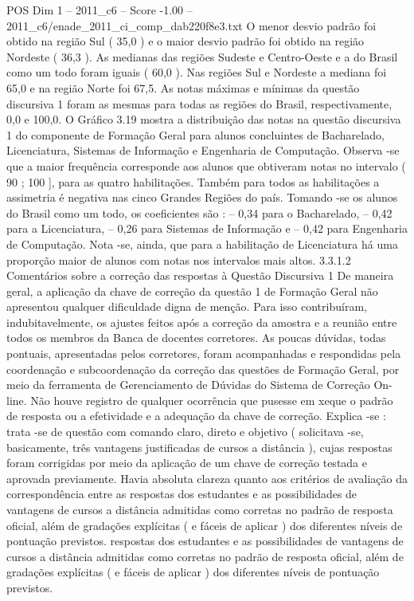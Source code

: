 \begin{textsample}{POS Dim 1 – 2011\_c6 – Score -1.00 – 2011\_c6/enade\_2011\_ci\_comp\_dab220f8e3.txt}
O menor desvio padrão foi obtido na região Sul ( 35,0 ) e o maior desvio padrão foi obtido na região Nordeste ( 36,3 ).
As medianas das regiões Sudeste e Centro-Oeste e a do Brasil como um todo foram iguais ( 60,0 ).
Nas regiões Sul e Nordeste a mediana foi 65,0 e na região Norte foi 67,5.
As notas máximas e mínimas da questão discursiva 1 foram as mesmas para todas as regiões do Brasil, respectivamente, 0,0 e 100,0.
O Gráfico 3.19 mostra a distribuição das notas na questão discursiva 1 do componente de Formação Geral para alunos concluintes de Bacharelado, Licenciatura, Sistemas de Informação e Engenharia de Computação.
Observa -se que a maior frequência corresponde aos alunos que obtiveram notas no intervalo ( 90 ; 100 ], para as quatro habilitações.
Também para todos as habilitações a assimetria é negativa nas cinco Grandes Regiões do país.
Tomando -se os alunos do Brasil como um todo, os coeficientes são : – 0,34 para o Bacharelado, – 0,42 para a Licenciatura, – 0,26 para Sistemas de Informação e – 0,42 para Engenharia de Computação.
Nota -se, ainda, que para a habilitação de Licenciatura há uma proporção maior de alunos com notas nos intervalos mais altos. 3.3.1.2 Comentários sobre a correção das respostas à Questão Discursiva 1 De maneira geral, a aplicação da chave de correção da questão 1 de Formação Geral não apresentou qualquer dificuldade digna de menção.
Para isso contribuíram, indubitavelmente, os ajustes feitos após a correção da amostra e a reunião entre todos os membros da Banca de docentes corretores.
As poucas dúvidas, todas pontuais, apresentadas pelos corretores, foram acompanhadas e respondidas pela coordenação e subcoordenação da correção das questões de Formação Geral, por meio da ferramenta de Gerenciamento de Dúvidas do Sistema de Correção On-line.
Não houve registro de qualquer ocorrência que pusesse em xeque o padrão de resposta ou a efetividade e a adequação da chave de correção.
Explica -se : trata -se de questão com comando claro, direto e objetivo ( solicitava -se, basicamente, três vantagens justificadas de cursos a distância ), cujas respostas foram corrigidas por meio da aplicação de um chave de correção testada e aprovada previamente.
Havia absoluta clareza quanto aos critérios de avaliação da correspondência entre as respostas dos estudantes e as possibilidades de vantagens de cursos a distância admitidas como corretas no padrão de resposta oficial, além de gradações explícitas ( e fáceis de aplicar ) dos diferentes níveis de pontuação previstos. respostas dos estudantes e as possibilidades de vantagens de cursos a distância admitidas como corretas no padrão de resposta oficial, além de gradações explícitas ( e fáceis de aplicar ) dos diferentes níveis de pontuação previstos.

\end{textsample}
